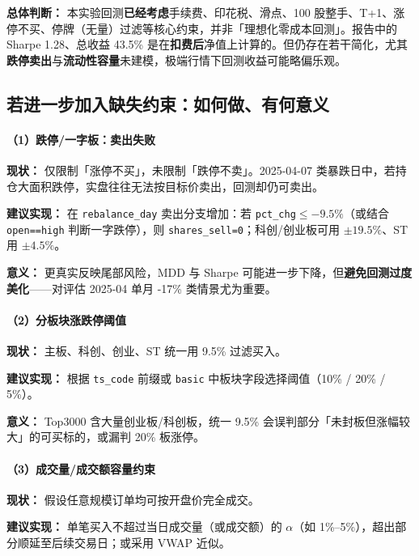 \documentclass[UTF8,a4paper,12pt]{ctexart}
\begin{document}
\textbf{总体判断：} 本实验回测\textbf{已经考虑}手续费、印花税、滑点、100 股整手、T+1、涨停不买、停牌（无量）过滤等核心约束，并非「理想化零成本回测」。报告中的 Sharpe 1.28、总收益 43.5\% 是在\textbf{扣费后}净值上计算的。但仍存在若干简化，尤其\textbf{跌停卖出}与\textbf{流动性容量}未建模，极端行情下回测收益可能略偏乐观。

\subsection{若进一步加入缺失约束：如何做、有何意义}

\paragraph{（1）跌停/一字板：卖出失败}

\textbf{现状：} 仅限制「涨停不买」，未限制「跌停不卖」。2025-04-07 类暴跌日中，若持仓大面积跌停，实盘往往无法按目标价卖出，回测却仍可卖出。

\textbf{建议实现：} 在 \texttt{rebalance\_day} 卖出分支增加：若 \texttt{pct\_chg}$\le -9.5\%$（或结合 \texttt{open==high} 判断一字跌停），则 \texttt{shares\_sell=0}；科创/创业板可用 $\pm 19.5\%$、ST 用 $\pm 4.5\%$。

\textbf{意义：} 更真实反映尾部风险，MDD 与 Sharpe 可能进一步下降，但\textbf{避免回测过度美化}——对评估 2025-04 单月 -17\% 类情景尤为重要。

\paragraph{（2）分板块涨跌停阈值}

\textbf{现状：} 主板、科创、创业、ST 统一用 9.5\% 过滤买入。

\textbf{建议实现：} 根据 \texttt{ts\_code} 前缀或 \texttt{basic} 中板块字段选择阈值（10\% / 20\% / 5\%）。

\textbf{意义：} Top3000 含大量创业板/科创板，统一 9.5\% 会误判部分「未封板但涨幅较大」的可买标的，或漏判 20\% 板涨停。

\paragraph{（3）成交量/成交额容量约束}

\textbf{现状：} 假设任意规模订单均可按开盘价完全成交。

\textbf{建议实现：} 单笔买入不超过当日成交量（或成交额）的 $\alpha$（如 1\%--5\%），超出部分顺延至后续交易日；或采用 VWAP 近似。
\end{document}
